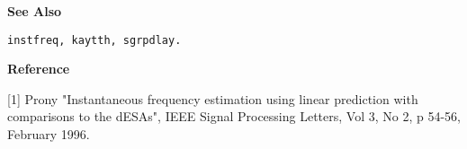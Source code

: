 
{\bf \large \sf See Also}\\
\hspace*{1.5cm}
\begin{minipage}[t]{13.5cm}
\begin{verbatim}
instfreq, kaytth, sgrpdlay.
\end{verbatim}
\end{minipage}
\vspace*{.5cm}


{\bf \large \sf Reference}\\
\hspace*{1.5cm}
\begin{minipage}[t]{13.5cm}
[1] Prony "Instantaneous frequency estimation using linear prediction with
	comparisons to the dESAs", IEEE Signal Processing Letters, Vol 3,
	No 2, p 54-56, February 1996.
\end{minipage}





